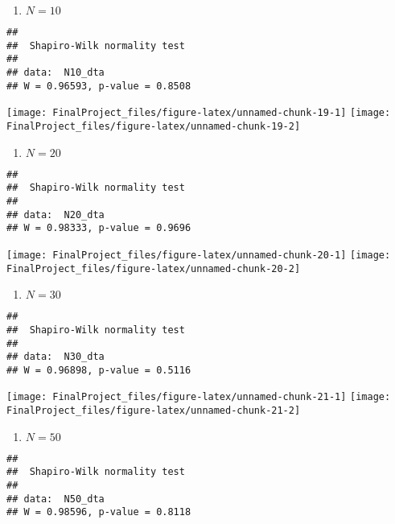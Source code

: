 \documentclass[]{article}
\providecommand{\tightlist}{%
  \setlength{\itemsep}{0pt}\setlength{\parskip}{0pt}}
\begin{document}
\begin{enumerate}
\def\labelenumi{\arabic{enumi}.}
\setcounter{enumi}{2}
\tightlist
\item
  \(N = 10\)
\end{enumerate}

\begin{verbatim}
## 
##  Shapiro-Wilk normality test
## 
## data:  N10_dta
## W = 0.96593, p-value = 0.8508
\end{verbatim}

\texttt{[image: FinalProject\_files/figure-latex/unnamed-chunk-19-1]}
\texttt{[image: FinalProject\_files/figure-latex/unnamed-chunk-19-2]}

\begin{enumerate}
\def\labelenumi{\arabic{enumi}.}
\setcounter{enumi}{3}
\tightlist
\item
  \(N = 20\)
\end{enumerate}

\begin{verbatim}
## 
##  Shapiro-Wilk normality test
## 
## data:  N20_dta
## W = 0.98333, p-value = 0.9696
\end{verbatim}

\texttt{[image: FinalProject\_files/figure-latex/unnamed-chunk-20-1]}
\texttt{[image: FinalProject\_files/figure-latex/unnamed-chunk-20-2]}

\begin{enumerate}
\def\labelenumi{\arabic{enumi}.}
\setcounter{enumi}{4}
\tightlist
\item
  \(N = 30\)
\end{enumerate}

\begin{verbatim}
## 
##  Shapiro-Wilk normality test
## 
## data:  N30_dta
## W = 0.96898, p-value = 0.5116
\end{verbatim}

\texttt{[image: FinalProject\_files/figure-latex/unnamed-chunk-21-1]}
\texttt{[image: FinalProject\_files/figure-latex/unnamed-chunk-21-2]}

\begin{enumerate}
\def\labelenumi{\arabic{enumi}.}
\setcounter{enumi}{4}
\tightlist
\item
  \(N = 50\)
\end{enumerate}

\begin{verbatim}
## 
##  Shapiro-Wilk normality test
## 
## data:  N50_dta
## W = 0.98596, p-value = 0.8118
\end{verbatim}
\end{document}

